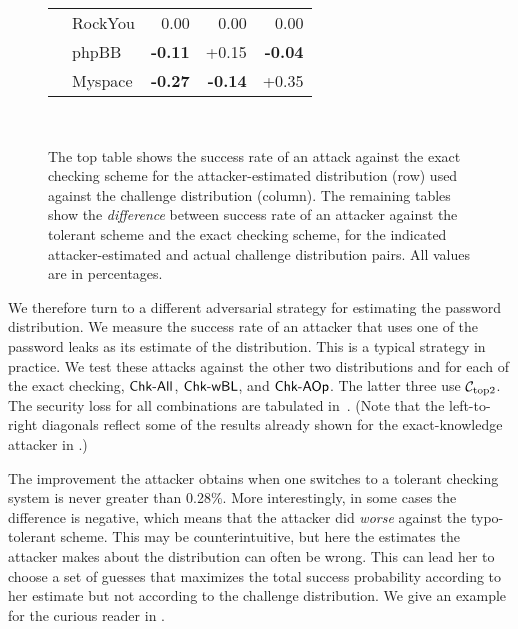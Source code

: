 \begin{figure}[t]
\begin{tabular}[t]{c|l|rrr|}
    & RockYou& 0.00 &0.00 &{0.00\Tstrut}\\
    & phpBB  & \textbf{-0.11}  & +0.15 & \textbf{-0.04}\\
    & Myspace&\textbf{-0.27}  & \textbf{-0.14} & +0.35\\\cline{2-5}
  \end{tabular}\\
  \vspace{0.1in}
  \caption{The top table shows the success rate of an attack against the exact checking
  scheme for the attacker-estimated distribution (row) used 
  against the challenge distribution (column). The remaining tables
  show the \emph{difference} between success rate of an attacker against the tolerant scheme and the exact
  checking scheme, for the indicated attacker-estimated and actual challenge distribution pairs.
  All values are in percentages.}
\label{fig:leakvsleak}
\end{figure}


We therefore turn to a different adversarial strategy for estimating the
password distribution. We measure the success rate of an attacker that uses one
of the password leaks as its estimate of the distribution. This is a typical
strategy in practice. 
We test these attacks
against the other two distributions and for each of the exact checking,
$\textnormal{\textsf{Chk-All}}$, $\textnormal{\textsf{Chk-wBL}}$, and $\textnormal{\textsf{Chk-AOp}}$. The latter three use ${\mathcal C}_{\textrm{top2}}$. 
The security loss for all combinations are tabulated
in~. (Note that the left-to-right diagonals
reflect some of the results already shown for the exact-knowledge attacker in
.) 

The improvement the attacker obtains when one switches to a tolerant
checking system is never greater than 0.28\%.  More interestingly, in some cases
the difference is negative, which means that the attacker did \emph{worse}
against the typo-tolerant scheme. This may be counterintuitive, but here the
estimates the attacker makes about the distribution can often be wrong. This can
lead her to choose a set of guesses that maximizes the total success probability
according to her estimate but not according to the challenge distribution.
We give an example for the curious reader in .


